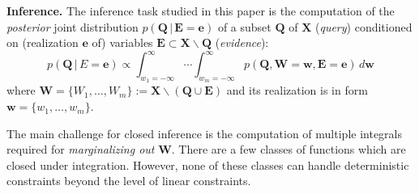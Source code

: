 \documentclass{article}
\renewcommand{\vec}[1]{\mathbf{#1}}
\newcommand{\bvec}[1]{\textbf{#1}}
\newcommand{\pr}{p}
\begin{document}
\textbf{Inference.}
The inference task studied in this paper is 
the computation of the \emph{posterior} joint distribution 
$\pr(\bvec{Q} \,|\, \bvec{E}=\bvec{e})$
of 
a subset $\bvec{Q}$ of $\bvec{X}$ (\emph{query})
conditioned on (realization $\bvec{e}$ of) 
variables  
$\bvec{E} \subset\bvec{X} \backslash \bvec{Q}$ (\emph{evidence}):
\begin{equation}
\label{e:inference}
\pr(\vec{Q} \,|\, E =\vec{e}) \propto 
\int_{w_1 = -\infty}^{\infty} \!\!\!\!\!\! \cdots \int_{w_m = -\infty}^{\infty}
\!\!\!\!\!\!\!\! \pr(\bvec{Q}, \bvec{W} = \bvec{w}, \bvec{E}=\bvec{e} )
\, d \bvec{w}
\end{equation}
where $\bvec{W} = \{W_1, \ldots, W_m\} := \vec{X} \backslash (\vec{Q} \cup \vec{E})$ and its realization is in form $\bvec{w} = \{w_1, \ldots, w_m\}$.

The main challenge for closed inference is the computation of multiple integrals required for \emph{marginalizing {\color{green}out}} $\bvec{W}$.
There are a few classes of functions which are closed under integration.
However, none of these classes can handle deterministic constraints beyond the level of linear constraints.

\end{document}
